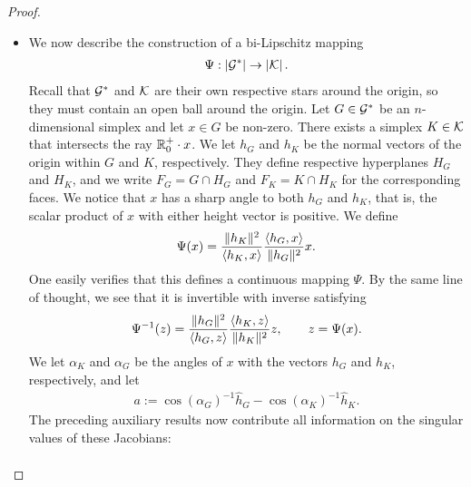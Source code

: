 \documentclass[10pt,a4paper]{article}
\newcommand{\mwl}[1]{{\color{red}#1}}
\begin{document}
\begin{proof}
\begin{itemize}
        \item 
        We now describe the construction of a bi-Lipschitz mapping 
        \begin{align*}
            \Psi : \left| {\mathcal G}^\ast \right| \rightarrow \left| {\mathcal K} \right|.
        \end{align*}
        Recall that ${\mathcal G}^\ast$ and ${\mathcal K}$ are their own respective stars around the origin,
        so they must contain an open ball around the origin. 
        Let ${G} \in {\mathcal G}^\ast$ be an $n$-dimensional simplex and let $x \in {G}$ be non-zero. There exists a simplex $K \in {\mathcal K}$ that intersects the ray ${\mathbb R}_0^+ \cdot x$. We let $h_{{G}}$ and $h_{K}$ be the normal vectors of the origin within ${G}$ and $K$, respectively. They define respective hyperplanes $H_{G}$ and $H_{K}$,
        and we write $F_{G} = G \cap H_{G}$ and $F_{K} = K \cap H_{K}$ for the corresponding faces. 
        We notice that $x$ has a sharp angle to both $h_{{G}}$ and $h_{K}$,
        that is, the scalar product of $x$ with either height vector is positive. 
        We define 
        \begin{align*}
            \Psi(x) 
            = 
            \frac{ \|  h_K  \|^{2} }{ \langle h_K, x \rangle }
            \frac{ \langle h_{{G}}, x \rangle }{ \|  h_{{G}}  \|^{2} }
            x
            .
        \end{align*}
        One easily verifies that this defines a continuous mapping $\Psi$. 
        By the same line of thought, we see that it is invertible with inverse satisfying 
        \begin{align*}
            \Psi^{-1}(z) 
            = 
            \frac{ \|  h_{{G}}  \|^{2} }{ \langle h_{{G}}, z \rangle }
            \frac{ \langle h_K, z \rangle }{ \|  h_K  \|^{2} }
            z,
            \qquad 
            z = \Psi(x)
            .
        \end{align*}
        We let $\alpha_K$ and $\alpha_{{G}}$ be the angles of $x$ with the vectors $h_{{G}}$ and $h_{K}$, respectively,
        and let 
        \begin{align*}
            a := \cos(\alpha_{{G}})^{-1} \hat h_{{G}} - \cos(\alpha_K)^{-1} \hat h_K
            .
        \end{align*}
        The preceding auxiliary results now contribute all information on the singular values of these Jacobians:
        \begin{gather*}

\end{gather*}
\end{itemize}
\end{proof}
\end{document}

